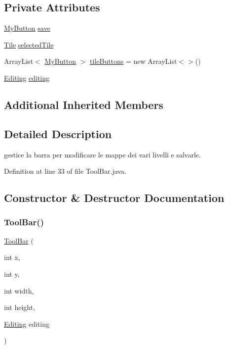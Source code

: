 \subsection*{Private Attributes}
\begin{DoxyCompactItemize}
\item 
\hyperlink{classui_1_1_my_button}{My\+Button} \hyperlink{classui_1_1_tool_bar_a66ab06e7800896887c475a3cbd86c447}{save}
\item 
\hyperlink{classobjects_1_1_tile}{Tile} \hyperlink{classui_1_1_tool_bar_a57de6d93afd033cf117e53aec7cf844a}{selected\+Tile}
\item 
Array\+List$<$ \hyperlink{classui_1_1_my_button}{My\+Button} $>$ \hyperlink{classui_1_1_tool_bar_a08aae8564da16789b69554ee7ddb559d}{tile\+Buttons} = new Array\+List$<$$>$()
\item 
\hyperlink{classscenes_1_1_editing}{Editing} \hyperlink{classui_1_1_tool_bar_a38f9dcf960197192269b03c788903b3e}{editing}
\end{DoxyCompactItemize}
\subsection*{Additional Inherited Members}


\subsection{Detailed Description}
gestice la barra per modificare le mappe dei vari livelli e salvarle. 

Definition at line 33 of file Tool\+Bar.\+java.



\subsection{Constructor \& Destructor Documentation}
\mbox{\label{classui_1_1_tool_bar_a43193f5c8a197b7b1ccfc248dec1db9b}} 
\subsubsection{\texorpdfstring{Tool\+Bar()}{ToolBar()}}
{\footnotesize\ttfamily \hyperlink{classui_1_1_tool_bar}{Tool\+Bar} (\begin{DoxyParamCaption}\item[{int}]{x,  }\item[{int}]{y,  }\item[{int}]{width,  }\item[{int}]{height,  }\item[{\hyperlink{classscenes_1_1_editing}{Editing}}]{editing }\end{DoxyParamCaption})}



